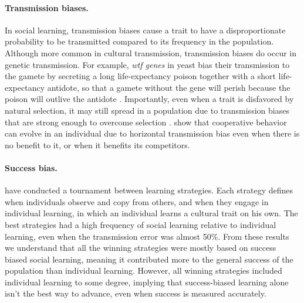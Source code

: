 \documentclass[12pt]{extarticle}
\begin{document}
\paragraph{Transmission biases.}
In social learning, transmission biases cause a trait to have a disproportionate probability to be transmitted compared to its frequency in the population.
Although more common in cultural transmission, transmission biases do occur in genetic transmission. For example, \textit{wtf genes} in yeast bias their transmission to the gamete by secreting a long life-expectancy poison together with a short life-expectancy antidote, so that a gamete without the gene will perish because the poison will outlive the antidote \citep{wtfGene}.
Importantly, even when a trait is disfavored by natural selection, it may still spread in a population due to transmission biases that are strong enough to overcome selection \citep[Ch. 8 pg. 279]{evolutionBook}.
\citet{cooperation} show that cooperative behavior can evolve in an individual due to horizontal transmission bias even when there is no benefit to it, or when it benefits its competitors.

\paragraph{Success bias.}
\citet{strategiesPaper} have conducted a tournament between learning strategies. Each strategy defines when individuals observe and copy from others, and when they engage in individual learning, in which an individual learns a cultural trait on his own. The best strategies had a high frequency of social learning relative to individual learning, even when the transmission error was almost 50\%. From these results we understand that all the winning strategies were mostly based on success biased social learning, meaning it contributed more to the general success of the population than individual learning. However, all winning strategies included individual learning to some degree, implying that success-biased learning alone isn't the best way to advance, even when success is measured accurately.
\end{document}
